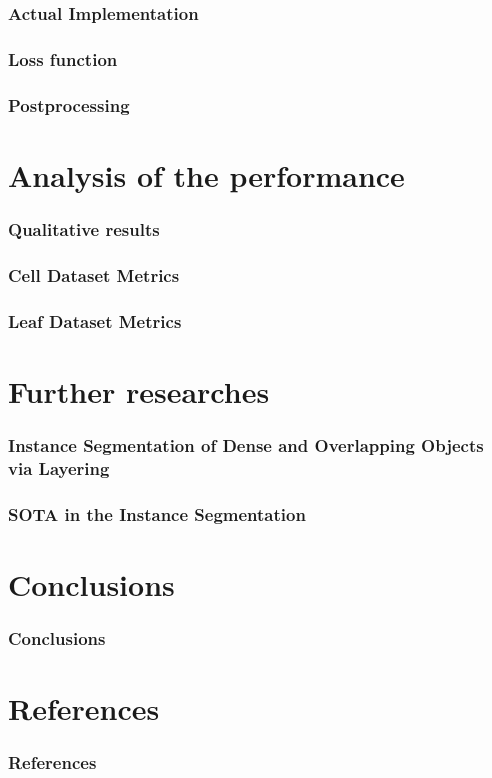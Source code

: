 \documentclass{beamer}
\begin{document}
\begin{frame}
    \frametitle{Actual Implementation}


\end{frame}

\begin{frame}
    \frametitle{Loss function}



\end{frame}

\begin{frame}
    \frametitle{Postprocessing}



\end{frame}

\section{Analysis of the performance}

\begin{frame}
    \frametitle{Qualitative results }



\end{frame}

\begin{frame}
    \frametitle{Cell Dataset Metrics}



\end{frame}

\begin{frame}
    \frametitle{Leaf Dataset Metrics}



\end{frame}

\section{Further researches}

\begin{frame}
    \frametitle{Instance Segmentation of Dense and Overlapping Objects via Layering}



\end{frame}

\begin{frame}
    \frametitle{SOTA in the Instance Segmentation}

\end{frame}

\section*{Conclusions}
\begin{frame}
    \frametitle{Conclusions}



\end{frame}

\section*{References}

\begin{frame}[allowframebreaks]
    \frametitle{References}

    \nocite{chen2019instance}

    
    
\end{frame}
\end{document}
